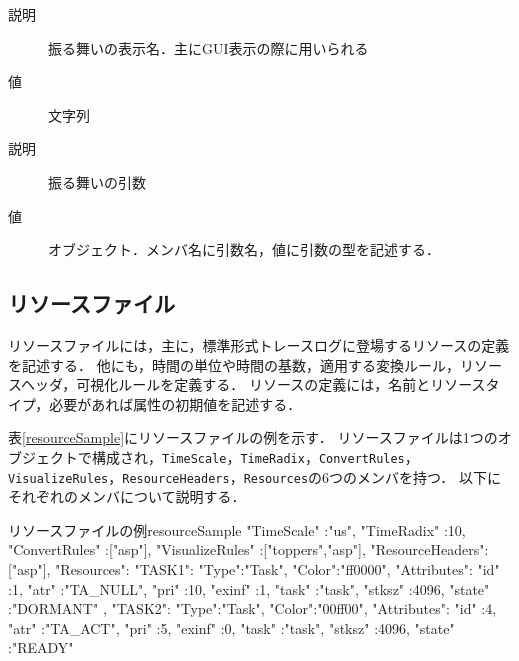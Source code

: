 \begin{description}
\begin{description}
            \begin{description}
            \setlength{\itemsep}{-1.5\itemsep}
            {\nopagebreak
            \item[\texttt{DisplayName}] \mbox{}
            \vspace{-0.25zw}
                \begin{description}
                \item[説明] 振る舞いの表示名．主にGUI表示の際に用いられる
                \item[値] 文字列
                \end{description}
            }{\nopagebreak
            \item[\texttt{Arguments}] \mbox{}
            \vspace{-0.25zw}
                \begin{description}
                \item[説明] 振る舞いの引数
                \item[値] オブジェクト．メンバ名に引数名，値に引数の型を記述する．
                \end{description}
            }
            \end{description}
    \end{description}
\end{description}

\subsection{リソースファイル}
\label{subsec:resFile}

リソースファイルには，主に，標準形式トレースログに登場するリソースの定義を記述する．
他にも，時間の単位や時間の基数，適用する変換ルール，リソースヘッダ，可視化ルールを定義する．
リソースの定義には，名前とリソースタイプ，必要があれば属性の初期値を記述する．

表\ref{resourceSample}にリソースファイルの例を示す．
リソースファイルは1つのオブジェクトで構成され，\verb|TimeScale|，\verb|TimeRadix|，\verb|ConvertRules|，\verb|VisualizeRules|，\verb|ResourceHeaders|，\verb|Resources|の6つのメンバを持つ．
以下にそれぞれのメンバについて説明する．

\begin{FileHere}{リソースファイルの例}{resourceSample}
{
  "TimeScale" :"us",
  "TimeRadix" :10,
  "ConvertRules"   :["asp"],
  "VisualizeRules" :["toppers","asp"],
  "ResourceHeaders":["asp"],
  "Resources":{
    "TASK1":{
      "Type":"Task",
      "Color":"ff0000",
      "Attributes":{
        "id"    :1,
        "atr"   :"TA_NULL",
        "pri"   :10,
        "exinf" :1,
        "task"  :"task",
        "stksz" :4096,
        "state" :"DORMANT"
      }
    },
    "TASK2":{
      "Type":"Task",
      "Color":"00ff00",
      "Attributes":{
        "id"    :4,
        "atr"   :"TA_ACT",
        "pri"   :5,
        "exinf" :0,
        "task"  :"task",
        "stksz" :4096,
        "state" :"READY"
      }
    }
  }
}
\end{FileHere}

